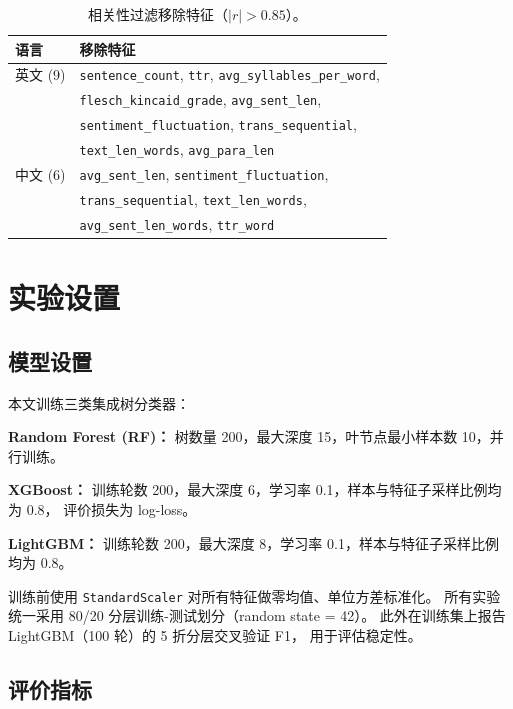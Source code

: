 \documentclass[sigconf]{acmart}
\begin{document}
\begin{table}[h]
\centering
\caption{相关性过滤移除特征（$|r|{>}0.85$）。}
\label{tab:removed}
\small
\begin{tabular}{ll}
\toprule
\textbf{语言} & \textbf{移除特征} \\
\midrule
英文 (9) & \texttt{sentence\_count}, \texttt{ttr}, \texttt{avg\_syllables\_per\_word}, \\
            & \texttt{flesch\_kincaid\_grade}, \texttt{avg\_sent\_len}, \\
            & \texttt{sentiment\_fluctuation}, \texttt{trans\_sequential}, \\
            & \texttt{text\_len\_words}, \texttt{avg\_para\_len} \\
\midrule
中文 (6) & \texttt{avg\_sent\_len}, \texttt{sentiment\_fluctuation}, \\
            & \texttt{trans\_sequential}, \texttt{text\_len\_words}, \\
            & \texttt{avg\_sent\_len\_words}, \texttt{ttr\_word} \\
\bottomrule
\end{tabular}
\end{table}

\section{实验设置}

\subsection{模型设置}

本文训练三类集成树分类器：

\textbf{Random Forest (RF)：}
树数量 200，最大深度 15，叶节点最小样本数 10，并行训练。

\textbf{XGBoost：}
训练轮数 200，最大深度 6，学习率 0.1，样本与特征子采样比例均为 0.8，
评价损失为 log-loss。

\textbf{LightGBM：}
训练轮数 200，最大深度 8，学习率 0.1，样本与特征子采样比例均为 0.8。

训练前使用 \texttt{StandardScaler} 对所有特征做零均值、单位方差标准化。
所有实验统一采用 80/20 分层训练-测试划分（random state = 42）。
此外在训练集上报告 LightGBM（100 轮）的 5 折分层交叉验证 F1，
用于评估稳定性。

\subsection{评价指标}
\end{document}
